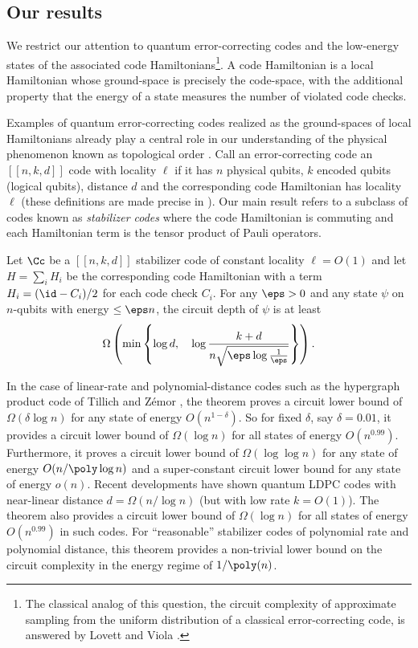 \documentclass{toc}
\begin{document}
\subsection{Our results}


We restrict our attention to quantum error-correcting codes and the low-energy states of the associated code Hamiltonians\footnote{The classical analog of this question, the circuit complexity of approximate sampling from the uniform distribution of a classical error-correcting code, is answered by Lovett and Viola \cite{lovett-viola}.}. A code Hamiltonian is a local Hamiltonian whose ground-space is precisely the code-space, with the additional property that the energy of a state measures the number of violated code checks. 

Examples of quantum error-correcting codes realized as the ground-spaces of local Hamiltonians already play a central role in our understanding of the physical phenomenon known as topological order \cite{KITAEV20032,PhysRevLett.107.210501}. 
%
Call an error-correcting code an $[[n,k,d]]$ code with locality $\ell$ if it has $n$ physical qubits, %
$k$ encoded qubits (logical qubits), %
distance $d$ and the corresponding code Hamiltonian has locality $\ell$ (these definitions are made precise in ).
%
Our main result refers to a subclass of codes known as \emph{stabilizer codes} where the code Hamiltonian is commuting and each Hamiltonian term is the tensor product of Pauli operators.

\begin{theorem}
\label{thm:main}
Let $\Cc$ be a $[[n,k,d]]$ stabilizer code of constant locality $\ell=O(1)$ and let $H=\sum_i H_i$ be the corresponding code Hamiltonian with a term $H_i = (\id - C_i)/2$ for each code check $C_i$. For any $\eps>0$ and any state $\psi$ on $n$-qubits with energy $\leq\eps n$, the circuit depth of $\psi$ is at least
\begin{align}
    \Omega \left( \min \left\{ \log d, \quad \log {\frac{k + d}{n\sqrt{\eps \log\frac{1}{\eps}}}} \right\} \right).
\end{align}
\end{theorem}

In the case of linear-rate and polynomial-distance codes such as the hypergraph product code of Tillich and Z\'emor \cite{5205648}, the theorem proves a circuit lower bound of $\Omega(\delta \log n)$ for any state of energy $O(n^{1-\delta})$. So for fixed $\delta$, say $\delta = 0.01$, it provides a circuit lower bound of $\Omega(\log n)$ for all states of energy $O(n^{0.99})$. Furthermore, it proves a circuit lower bound of $\Omega(\log \log n)$ for any state of energy $O(n/\poly \log n)$ and a super-constant circuit lower bound for any state of energy $o(n)$. {Recent developments \cite{panteleev2020quantum, hastings2020fiber,Breuckmann2020BalancedPQ} have shown quantum LDPC codes with near-linear distance $d=\Omega(n/\log n)$  (but with low rate $k=O(1)$). The theorem also provides a circuit lower bound of $\Omega(\log n)$ for all states of energy $O(n^{0.99})$ in such codes.}
For ``reasonable'' stabilizer codes of polynomial rate and polynomial distance, this theorem provides a non-trivial lower bound on the circuit complexity in the energy regime of $1/\poly(n)$. 
\end{document}

